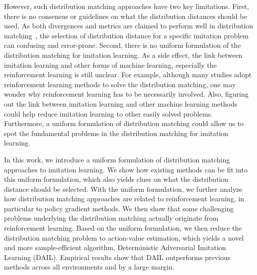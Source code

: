 However, such distribution matching approaches have two key limitations.
First, there is no consensus or guidelines on what the distribution distances should be used. 
As both divergences and metrics are claimed to perform well in distribution matching~\citep{ke2019imitation,ghasemipour2020divergence,xiao2019wasserstein}, the selection of distribution distance for a specific imitation problem can confusing and error-prone. %
Second, there is no uniform formulation of the distribution matching for imitation learning. 
As a side effect, the link between imitation learning and other forms of machine learning, especially the reinforcement learning is still unclear. 
For example, although many studies adopt reinforcement learning methods to solve the distribution matching, 
one may wonder why reinforcement learning has to be necessarily involved. 
Also, figuring out the link between imitation learning and other machine learning methods could help reduce imitation learning to other easily solved problems. 
Furthermore, a uniform formulation of distribution matching could allow us to spot the fundamental problems in the distribution matching for imitation learning. 


In this work, we introduce a uniform formulation of distribution matching approaches to imitation learning. 
We show how existing methods can be fit into this uniform formulation, 
which also yields clues on what the distribution distance should be selected. 
With the uniform formulation, we further analyze how distribution matching approaches are related to reinforcement learning, in particular to policy gradient methods. 
We then show that some challenging problems underlying the distribution matching actually  originate from reinforcement learning. 
Based on the uniform formulation, we then reduce the distribution matching problem to action-value estimation, which yields a novel and more sample-efficient algorithm, Deterministic Adversarial Imitation Learning (DAIL). 
Empirical results show that DAIL outperforms previous methods across all environments and by a large margin. 
